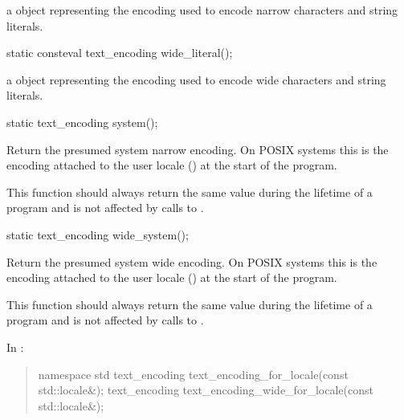 \documentclass{wg21}
\begin{document}
\begin{addedblock}
\begin{itemdescr}
    \returns a  object representing the encoding used to encode narrow characters and string literals.
\end{itemdescr}

\begin{itemdecl}
static consteval text_encoding wide_literal();
\end{itemdecl}

\begin{itemdescr}
    \returns a  object representing the encoding used to encode wide characters and string literals.
\end{itemdescr}

\begin{itemdecl}
static text_encoding system();
\end{itemdecl}

\begin{itemdescr}
Return the presumed system narrow encoding.
On POSIX systems this is the encoding attached to the user locale () at the start of the program.

\begin{note}
This function should always return the same value during the lifetime of a program and is not affected by calls to .
\end{note}

\end{itemdescr}

\begin{itemdecl}
static text_encoding wide_system();
\end{itemdecl}

\begin{itemdescr}
Return the presumed system wide encoding.
On POSIX systems this is the encoding attached to the user locale () at the start of the program.

\begin{note}
This function should always return the same value during the lifetime of a program and is not affected by calls to .
\end{note}
\end{itemdescr}


\end{addedblock}

In :

\begin{quote}
\begin{addedblock}

\begin{codeblock}

namespace std {
    text_encoding text_encoding_for_locale(const std::locale&);
    text_encoding text_encoding_wide_for_locale(const std::locale&);
}

\end{codeblock}
\end{addedblock}
\end{quote}
\end{document}
